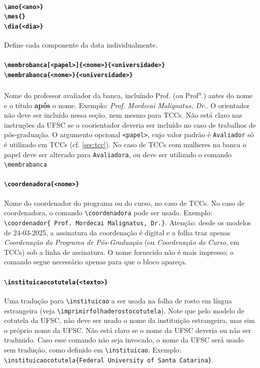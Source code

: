 \documentclass[embeddedlogo]{ufsc-thesis-rn46-2019}
\newcommand{\lacmd}[1]{\texttt{\textbackslash{}#1}}
\begin{document}
\paragraph*{\lacmd{ano\{<ano>\}} \\
            \lacmd{mes\{<nome do mes>\}} \\
            \lacmd{dia\{<dia>\}}}
Define cada componente da data individualmente.

\paragraph*{\lacmd{membrobanca[<papel>]\{<nome>\}\{<universidade>\}} \\
            \lacmd{membrabanca\{<nome>\}\{<universidade>\}}}
Nome do professor avaliador da banca, incluíndo Prof. (ou
Prof\textsuperscript{a}.) antes do nome e o título \textbf{após} o
nome. Exemplo: \emph{Prof. Mordecai Malignatus, Dr.}. O orientador não deve ser
incluído nessa seção, nem mesmo para TCCs. Não está claro nas instruções da UFSC
se o coorientador deveria ser incluído no caso de trabalhos de pós-graduação. O
argumento opcional \texttt{<papel>}, cujo valor padrão é \texttt{Avaliador} só é
utilizado em TCCs (cf. \autoref{sec:tcc}). No caso de TCCs com mulheres na banca
o papel deve ser alterado para \texttt{Avaliadora}, ou deve ser utilizado o
comando \lacmd{membrabanca}

\paragraph*{\lacmd{coordenadora\{<nome>\}}} Nome do coordenador do programa ou
do curso, no caso de TCCs. No caso de coordenadora, o comando
\lacmd{coordenadora} pode ser usado. Exemplo: \lacmd{coordenador\{
  Prof. Mordecai Malignatus, Dr.\}}. Atenção: desde os modelos de 24-03-2025, a
assinatura da coordenação é digital e a folha traz apenas \emph{Coordenação do
Programa de Pós-Graduação} (ou \emph{Coordenação do Curso}, em TCCs) sob a
linha de assinatura. O nome fornecido não é mais impresso; o comando segue
necessário apenas para que o bloco apareça.

\paragraph*{\lacmd{instituicaocotutela\{<texto>\}}} Uma tradução para
\lacmd{instituicao} a ser usada na folha de rosto em língua estrangeira (veja
\lacmd{imprimirfolhaderostocotutela}). Note que pelo modelo de cotutela da UFSC,
não deve ser usado o nome da instituição estrangeira, mas sim o próprio nome
da UFSC. Não está claro se o nome da UFSC deveria ou não ser traduzido. Caso
esse comando não seja invocado, o nome da UFSC será usado sem tradução, como
definido em \lacmd{instituicao}. Exemplo:
\lacmd{instituicaocotutela\{Federal University of Santa Catarina\}}.
\end{document}
